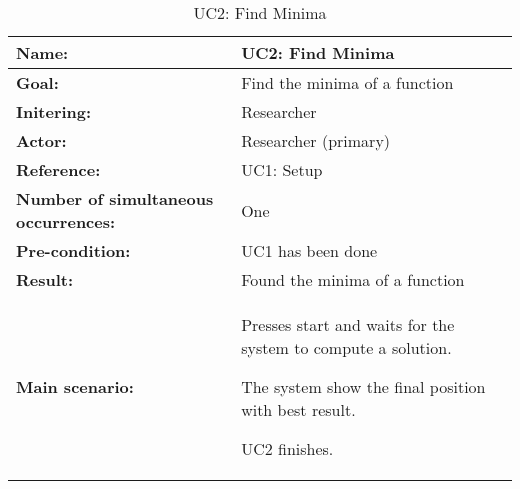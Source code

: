\begin{table}[H]
	\begin{tabularx}{\textwidth}{| >{\raggedright\arraybackslash}p{3.3 cm} | >{\raggedright\arraybackslash}X |} \hline
		
		\textbf{Name:} 						& UC2: Find Minima\\ \hline
		\textbf{Goal:}						& Find the minima of a function \\ \hline
		\textbf{Initering:}					& Researcher \\ \hline
		\textbf{Actor:} 					& Researcher (primary) \\ \hline
		\textbf{Reference:} 				& UC1: Setup \\ \hline
		\textbf{Number of simultaneous occurrences:} & One \\ \hline
		\textbf{Pre-condition:} 			& UC1 has been done \\ \hline
		\textbf{Result:}					& Found the minima of a function \\ \hline
		\textbf{Main scenario:}				& 
		
		\begin{packed_enum}
			\item Presses start and waits for the system to compute a solution.
			\item The system show the final position with best result.
			\item UC2 finishes.
		\end{packed_enum} \\ \hline
	\end{tabularx}
\caption{UC2: Find Minima}
\label{tbl:uc2}
\end{table}